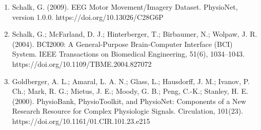\documentclass[11pt]{article}
\begin{document}
\begin{enumerate}
\item Schalk, G. (2009). EEG Motor Movement/Imagery Dataset. PhysioNet, version 1.0.0. https://doi.org/10.13026/C28G6P
\item Schalk, G.; McFarland, D. J.; Hinterberger, T.; Birbaumer, N.; Wolpaw, J. R. (2004). BCI2000: A General-Purpose Brain-Computer Interface (BCI) System. IEEE Transactions on Biomedical Engineering, 51(6), 1034--1043. https://doi.org/10.1109/TBME.2004.827072
\item Goldberger, A. L.; Amaral, L. A. N.; Glass, L.; Hausdorff, J. M.; Ivanov, P. Ch.; Mark, R. G.; Mietus, J. E.; Moody, G. B.; Peng, C.-K.; Stanley, H. E. (2000). PhysioBank, PhysioToolkit, and PhysioNet: Components of a New Research Resource for Complex Physiologic Signals. Circulation, 101(23). https://doi.org/10.1161/01.CIR.101.23.e215
\end{enumerate}
\end{document}
